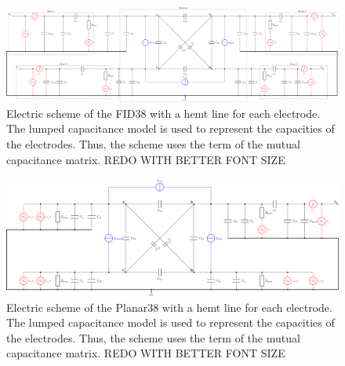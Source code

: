 \begin{landscape}

\begin{figure}
\centering
\includegraphics[height=0.25\textheight, width=\linewidth, keepaspectratio]{Figures/Electrodes/scheme_fid38_fat.png}
\caption{Electric scheme of the FID38 with a hemt line for each electrode. The lumped capacitance model is used to represent the capacities of the electrodes. Thus, the scheme uses the term of the mutual capacitance matrix. REDO WITH BETTER FONT SIZE}
\label{fig:scheme-fid38-fat}
\end{figure}

\begin{figure}
\centering
\includegraphics[height=0.25\textheight, width=\linewidth, keepaspectratio]{Figures/Electrodes/scheme_fid38_reduced.png}
\caption{Electric scheme of the Planar38 with a hemt line for each electrode. The lumped capacitance model is used to represent the capacities of the electrodes. Thus, the scheme uses the term of the mutual capacitance matrix. REDO WITH BETTER FONT SIZE}
\label{fig:scheme-fid38-redux}
\end{figure}

\end{landscape}
